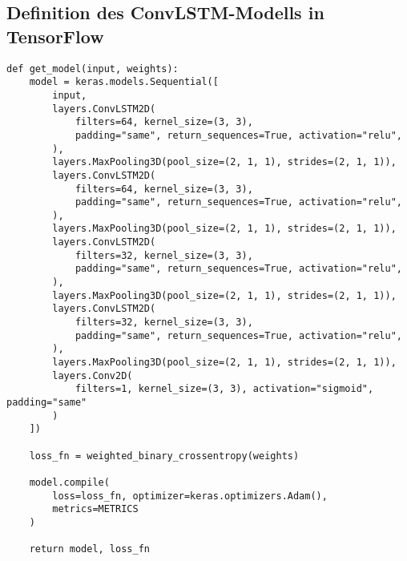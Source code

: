 \subsection{Definition des ConvLSTM-Modells in TensorFlow}
\label{sec:ModellDefTF}

\begin{code}
\begin{verbatim}
def get_model(input, weights):
    model = keras.models.Sequential([
        input,
        layers.ConvLSTM2D(
            filters=64, kernel_size=(3, 3),
            padding="same", return_sequences=True, activation="relu",
        ),
        layers.MaxPooling3D(pool_size=(2, 1, 1), strides=(2, 1, 1)),
        layers.ConvLSTM2D(
            filters=64, kernel_size=(3, 3),
            padding="same", return_sequences=True, activation="relu",
        ),
        layers.MaxPooling3D(pool_size=(2, 1, 1), strides=(2, 1, 1)),
        layers.ConvLSTM2D(
            filters=32, kernel_size=(3, 3),
            padding="same", return_sequences=True, activation="relu",
        ),
        layers.MaxPooling3D(pool_size=(2, 1, 1), strides=(2, 1, 1)),
        layers.ConvLSTM2D(
            filters=32, kernel_size=(3, 3),
            padding="same", return_sequences=True, activation="relu",
        ),
        layers.MaxPooling3D(pool_size=(2, 1, 1), strides=(2, 1, 1)),
        layers.Conv2D(
            filters=1, kernel_size=(3, 3), activation="sigmoid", padding="same"
        )
    ])

    loss_fn = weighted_binary_crossentropy(weights)

    model.compile(
        loss=loss_fn, optimizer=keras.optimizers.Adam(),
        metrics=METRICS
    )

    return model, loss_fn
\end{verbatim}
\label{lst:ModellDefTF}
\end{code}
